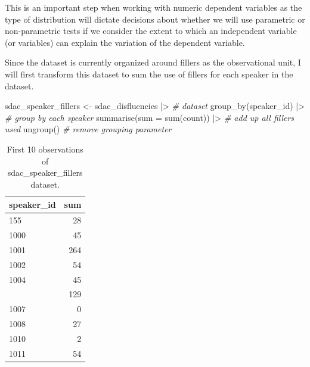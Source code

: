 \documentclass[
  letterpaper,
]{scrbook}
\newenvironment{Shaded}{\begin{snugshade}}{\end{snugshade}}
\newcommand{\AttributeTok}[1]{\textcolor[rgb]{0.00,0.00,0.00}{#1}}
\newcommand{\CommentTok}[1]{\textcolor[rgb]{0.00,0.00,0.00}{\textit{#1}}}
\newcommand{\FunctionTok}[1]{\textcolor[rgb]{0.00,0.00,0.00}{#1}}
\newcommand{\NormalTok}[1]{\textcolor[rgb]{0.00,0.00,0.00}{#1}}
\newcommand{\OtherTok}[1]{\textcolor[rgb]{0.00,0.00,0.00}{#1}}
\newcommand{\SpecialCharTok}[1]{\textcolor[rgb]{0.00,0.00,0.00}{#1}}
\begin{document}
\begin{tcolorbox}[enhanced jigsaw, title=\textcolor{quarto-callout-warning-color}{\faExclamationTriangle}\hspace{0.5em}{Tip}, breakable, colback=white, colframe=quarto-callout-warning-color-frame, bottomrule=.15mm, left=2mm, bottomtitle=1mm, colbacktitle=quarto-callout-warning-color!10!white, opacityback=0, arc=.35mm, toprule=.15mm, coltitle=black, leftrule=.75mm, opacitybacktitle=0.6, toptitle=1mm, titlerule=0mm, rightrule=.15mm]

This is an important step when working with numeric dependent variables
as the type of distribution will dictate decisions about whether we will
use parametric or non-parametric tests if we consider the extent to
which an independent variable (or variables) can explain the variation
of the dependent variable.

\end{tcolorbox}

Since the dataset is currently organized around fillers as the
observational unit, I will first transform this dataset to sum the use
of fillers for each speaker in the dataset.

\begin{Shaded}
\begin{Highlighting}[]
\NormalTok{sdac\_speaker\_fillers }\OtherTok{\textless{}{-}} 
\NormalTok{  sdac\_disfluencies }\SpecialCharTok{|\textgreater{}} \CommentTok{\# dataset}
  \FunctionTok{group\_by}\NormalTok{(speaker\_id) }\SpecialCharTok{|\textgreater{}} \CommentTok{\# group by each speaker}
  \FunctionTok{summarise}\NormalTok{(}\AttributeTok{sum =} \FunctionTok{sum}\NormalTok{(count)) }\SpecialCharTok{|\textgreater{}} \CommentTok{\# add up all fillers used}
  \FunctionTok{ungroup}\NormalTok{() }\CommentTok{\# remove grouping parameter}
\end{Highlighting}
\end{Shaded}

\hypertarget{tbl-i-uni-cont-sdac-transform-preview}{}
\begin{table}
\caption{\label{tbl-i-uni-cont-sdac-transform-preview}First 10 observations of sdac\_speaker\_fillers dataset. }\tabularnewline

\centering
\begin{tabular}{lr}
\toprule
speaker\_id & sum\\
\midrule
155 & 28\\
1000 & 45\\
1001 & 264\\
1002 & 54\\
1004 & 45\\
\addlinespace
1005 & 129\\
1007 & 0\\
1008 & 27\\
1010 & 2\\
1011 & 54\\
\bottomrule
\end{tabular}
\end{table}
\end{document}
